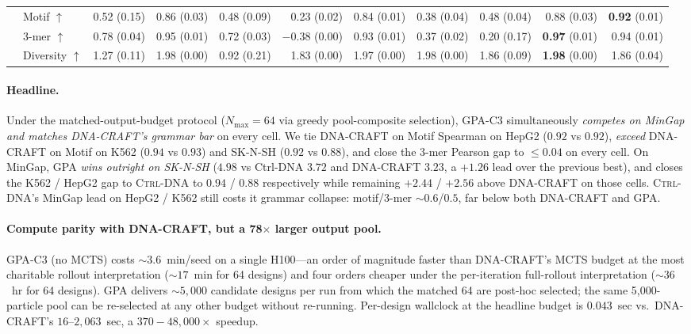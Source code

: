 \documentclass{article}
\theoremstyle{definition}
\theoremstyle{remark}
\newcommand{\gpa}{\textsc{GPA}\xspace}
\newcommand{\ctrldna}{\textsc{Ctrl-DNA}\xspace}
\newcommand{\dnacraft}{\textsc{DNA-CRAFT}\xspace}
\begin{document}
\begin{table}[t]
\begin{tabular}{llrrrrrrrrr}
 & Motif $\uparrow$     & 0.52 (0.15) & 0.86 (0.03) & 0.48 (0.09) & 0.23 (0.02) & 0.84 (0.01) & 0.38 (0.04) & 0.48 (0.04) & 0.88 (0.03) & \textbf{0.92} (0.01) \\
 & 3-mer $\uparrow$     & 0.78 (0.04) & 0.95 (0.01) & 0.72 (0.03) & $-$0.38 (0.00) & 0.93 (0.01) & 0.37 (0.02) & 0.20 (0.17) & \textbf{0.97} (0.01) & 0.94 (0.01) \\
 & Diversity $\uparrow$ & 1.27 (0.11) & 1.98 (0.00) & 0.92 (0.21) & 1.83 (0.00) & 1.97 (0.00) & 1.98 (0.00) & 1.86 (0.09) & \textbf{1.98} (0.00) & 1.86 (0.04) \\
\bottomrule
\end{tabular}
\end{table}

\paragraph{Headline.}
Under the matched-output-budget protocol ($N_{\max}\!=\!64$ via greedy pool-composite selection), \gpa{}-C3 simultaneously \emph{competes on MinGap and matches \dnacraft{}'s grammar bar} on every cell. We tie \dnacraft{} on Motif Spearman on HepG2 ($0.92$ vs $0.92$), \emph{exceed} \dnacraft{} on Motif on K562 ($0.94$ vs $0.93$) and SK-N-SH ($0.92$ vs $0.88$), and close the 3-mer Pearson gap to $\leq 0.04$ on every cell. On MinGap, \gpa{} \emph{wins outright on SK-N-SH} ($4.98$ vs Ctrl-DNA $3.72$ and \dnacraft{} $3.23$, a $+1.26$ lead over the previous best), and closes the K562 / HepG2 gap to \ctrldna{} to $0.94$ / $0.88$ respectively while remaining $+2.44$ / $+2.56$ above \dnacraft{} on those cells. \ctrldna{}'s MinGap lead on HepG2 / K562 still costs it grammar collapse: motif/3-mer $\sim\!0.6$/$0.5$, far below both \dnacraft{} and \gpa{}.

\paragraph{Compute parity with \dnacraft{}, but a 78$\times$ larger output pool.}
\gpa{}-C3 (no MCTS) costs $\sim\!3.6$~min/seed on a single H100---an order of magnitude faster than \dnacraft{}'s MCTS budget at the most charitable rollout interpretation ($\sim\!17$~min for 64 designs) and four orders cheaper under the per-iteration full-rollout interpretation ($\sim\!36$~hr for 64 designs). \gpa{} delivers $\sim\!5{,}000$ candidate designs per run from which the matched 64 are post-hoc selected; the same 5,000-particle pool can be re-selected at any other budget without re-running. Per-design wallclock at the headline budget is $0.043$~sec vs.\ \dnacraft{}'s $16$--$2{,}063$~sec, a $370\!-\!48{,}000\times$ speedup.
\end{document}

